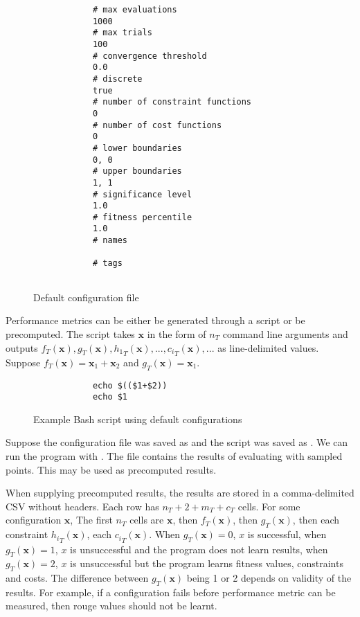 \documentclass[10pt,a4paper]{article}
\begin{document}
\begin{figure}[H]
	\begin{framed}
		\begin{verbatim}
			# max evaluations
			1000
			# max trials
			100
			# convergence threshold
			0.0
			# discrete
			true
			# number of constraint functions
			0
			# number of cost functions
			0
			# lower boundaries
			0, 0
			# upper boundaries
			1, 1
			# significance level
			1.0
			# fitness percentile
			1.0
			# names
			
			# tags
			
		\end{verbatim}
	\end{framed}
	\caption{Default configuration file}
\end{figure}

Performance metrics can be either be generated through a script or be precomputed. The script takes $\mathbf{x}$ in the form of $n_T$ command line arguments and outputs $f_T(\mathbf{x}),g_T(\mathbf{x}),{h_1}_T(\mathbf{x}),...,{c_i}_T(\mathbf{x}),...$ as line-delimited values. Suppose $f_T(\mathbf{x})=\mathbf{x}_1+\mathbf{x}_2$ and $g_T(\mathbf{x})=\mathbf{x}_1$.

\begin{figure}[H]
	\begin{framed}
		\begin{verbatim}
			echo $(($1+$2))
			echo $1
		\end{verbatim}
	\end{framed}
	\caption{Example Bash script using default configurations}
\end{figure}

Suppose the configuration file was saved as  and the script was saved as . We can run the program with . The file  contains the results of evaluating  with sampled points. This may be used as precomputed results.

When supplying precomputed results, the results are stored in a comma-delimited CSV without headers. Each row has $n_T+2+m_T+c_T$ cells. For some configuration $\mathbf{x}$, The first $n_T$ cells are $\mathbf{x}$, then $f_T(\mathbf{x})$, then $g_T(\mathbf{x})$, then each constraint ${h_i}_T(\mathbf{x})$, each ${c_i}_T(\mathbf{x})$. When $g_T(\mathbf{x})=0$, $x$ is successful, when $g_T(\mathbf{x})=1$, $x$ is unsuccessful and the program does not learn results, when $g_T(\mathbf{x})=2$, $x$ is unsuccessful but the program learns fitness values, constraints and costs. The difference between $g_T(\mathbf{x})$ being 1 or 2 depends on validity of the results. For example, if a configuration fails before performance metric can be measured, then rouge values should not be learnt.
\end{document}
